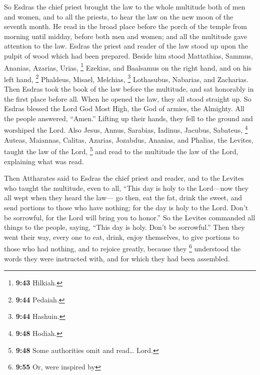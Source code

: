  So Esdras the chief priest brought the law to the whole
multitude both of men and women, and to all the priests, to hear the law
on the new moon of the seventh month.  He read in the
broad place before the porch of the temple from morning until midday,
before both men and women; and all the multitude gave attention to the
law.  Esdras the priest and reader of the law stood up
upon the pulpit of wood which had been prepared.  Beside
him stood Mattathias, Sammus, Ananias, Azarias, Urias, \footnote{\textbf{9:43}
  Hilkiah.} Ezekias, and Baalsamus on the right hand, 
and on his left hand, \footnote{\textbf{9:44} Pedaiah.} Phaldeus,
Misael, Melchias, \footnote{\textbf{9:44} Hashuin.} Lothasubus,
Nabarias, and Zacharias.  Then Esdras took the book of
the law before the multitude, and sat honorably in the first place
before all.  When he opened the law, they all stood
straight up. So Esdras blessed the Lord God Most High, the God of
armies, the Almighty.  All the people answered, ``Amen.''
Lifting up their hands, they fell to the ground and worshiped the Lord.
 Also Jesus, Annus, Sarabias, Iadinus, Jacubus, Sabateus,
\footnote{\textbf{9:48} Hodiah.} Auteas, Maiannas, Calitas, Azarias,
Jozabdus, Ananias, and Phalias, the Levites, taught the law of the Lord,
\footnote{\textbf{9:48} Some authorities omit and read\ldots{} Lord.}
and read to the multitude the law of the Lord, explaining what was read.

 Then Attharates said to Esdras the chief priest and
reader, and to the Levites who taught the multitude, even to all,
 ``This day is holy to the Lord---now they all wept when
they heard the law---  go then, eat the fat, drink the
sweet, and send portions to those who have nothing;  for
the day is holy to the Lord. Don't be sorrowful, for the Lord will bring
you to honor.''  So the Levites commanded all things to
the people, saying, ``This day is holy. Don't be sorrowful.''
 Then they went their way, every one to eat, drink, enjoy
themselves, to give portions to those who had nothing, and to rejoice
greatly,  because they \footnote{\textbf{9:55} Or, were
  inspired by} understood the words they were instructed with, and for
which they had been assembled.
